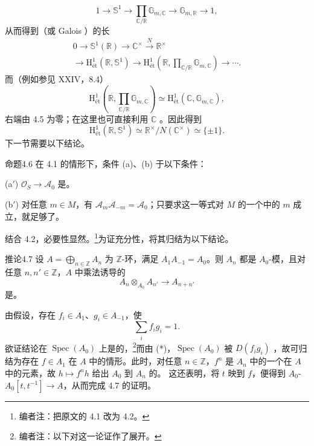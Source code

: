 \[
1\longrightarrow\mathbb S^1\longrightarrow\prod_{\mathbb C/\mathbb R}\mathbb G_{m,\mathbb C}\longrightarrow\mathbb G_{m,\mathbb R}\longrightarrow1,
\]
从而得到（或 Galois ）的长
\[
\begin{aligned}
0\longrightarrow\mathbb S^1(\mathbb R)\longrightarrow\mathbb C^\times
\xrightarrow{N}\mathbb R^\times\\
\longrightarrow\mathrm H^1_{\text{ét}}(\mathbb R,\mathbb S^1)
\longrightarrow\mathrm H^1_{\text{ét}}\!\left(\mathbb R,\prod_{\mathbb C/\mathbb R}\mathbb G_{m,\mathbb C}\right)\longrightarrow\cdots .
\end{aligned}
\]
而（例如参见 XXIV，8.4）
\[
\mathrm H^1_{\text{ét}}\!\left(\mathbb R,\prod_{\mathbb C/\mathbb R}\mathbb G_{m,\mathbb C}\right)
\simeq\mathrm H^1_{\text{ét}}(\mathbb C,\mathbb G_{m,\mathbb C}),
\]
右端由 4.5 为零；在这里也可直接利用 $\mathbb C$ 。因此得到
\[
\mathrm H^1_{\text{ét}}(\mathbb R,\mathbb S^1)\simeq\mathbb R^\times/N(\mathbb C^\times)\simeq\{\pm1\}.
\]
下一节需要以下结论。
\begin{SGAresult}{命题}{4.6}
在 4.1 的情形下，条件 (a)、(b) 于以下条件：

(a$'$) $\mathcal O_S\to\mathcal A_0$ 是。

(b$'$) 对任意 $m\in M$，有 $\mathcal A_m\mathcal A_{-m}=\mathcal A_0$；只要求这一等式对 $M$ 的一个中的 $m$ 成立，就足够了。
\end{SGAresult}
结合 4.2，必要性显然。\footnote[15]{编者注：把原文的 4.1 改为 4.2。}为证充分性，将其归结为以下结论。
\begin{SGAresult}{推论}{4.7}
设 $A=\bigoplus_{n\in\mathbb Z}A_n$ 为 $\mathbb Z$-环，满足 $A_1A_{-1}=A_0$。则 $A_n$ 都是 $A_0$-模，且对任意 $n,n'\in\mathbb Z$，$A$ 中乘法诱导的
\[
A_n\otimes_{A_0}A_{n'}\longrightarrow A_{n+n'}
\]
是。
\end{SGAresult}
由假设，存在 $f_i\in A_1$、$g_i\in A_{-1}$，使
\[
\sum_i f_ig_i=1.\tag{*}
\]
欲证结论在 $\operatorname{Spec}(A_0)$ 上是的，\footnote[16]{编者注：以下对这一论证作了展开。}而由 (*)，$\operatorname{Spec}(A_0)$ 被 $D(f_ig_i)$ ，故可归结为存在 $f\in A_1$ 在 $A$ 中的情形。此时，对任意 $n\in\mathbb Z$，$f^n$ 是 $A_n$ 中的一个在 $A$ 中的元素，故 $h\mapsto f^nh$ 给出 $A_0$ 到 $A_n$ 的。
这还表明，将 $t$ 映到 $f$，便得到 $A_0$- $A_0[t,t^{-1}]\to A$，从而完成 4.7 的证明。


